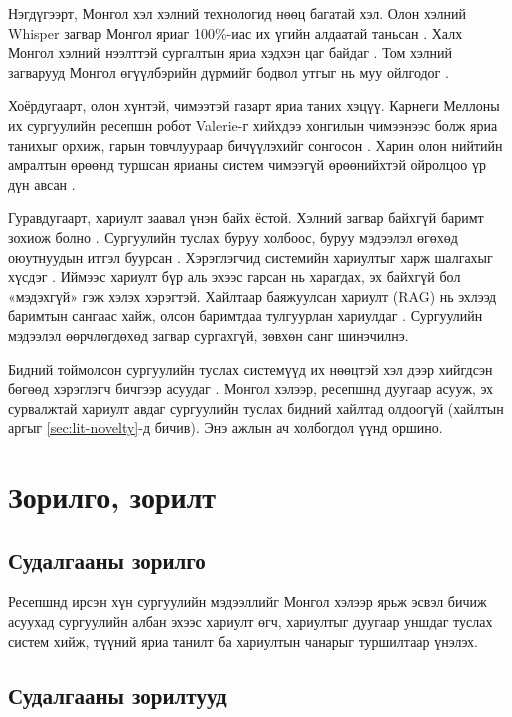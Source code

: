 Нэгдүгээрт, Монгол хэл хэлний технологид нөөц багатай хэл. Олон хэлний Whisper загвар Монгол яриаг 100\%-иас их үгийн алдаатай таньсан \cite{radford2023whisper}. Халх Монгол хэлний нээлттэй сургалтын яриа хэдхэн цаг байдаг \cite{mengke2025khalkha}. Том хэлний загварууд Монгол өгүүлбэрийн дүрмийг бодвол утгыг нь муу ойлгодог \cite{zhang2024mmeval}.

Хоёрдугаарт, олон хүнтэй, чимээтэй газарт яриа таних хэцүү. Карнеги Меллоны их сургуулийн ресепшн робот Valerie-г хийхдээ хонгилын чимээнээс болж яриа танихыг орхиж, гарын товчлуураар бичүүлэхийг сонгосон \cite{gockley2005valerie}. Харин олон нийтийн амралтын өрөөнд туршсан ярианы систем чимээгүй өрөөнийхтэй ойролцоо үр дүн авсан \cite{pappu2014public}.

Гуравдугаарт, хариулт заавал үнэн байх ёстой. Хэлний загвар байхгүй баримт зохиож болно \cite{lewis2020rag}. Сургуулийн туслах буруу холбоос, буруу мэдээлэл өгөхөд оюутнуудын итгэл буурсан \cite{antico2024unimib}. Хэрэглэгчид системийн хариултыг харж шалгахыг хүсдэг \cite{luger2016badpa}. Иймээс хариулт бүр аль эхээс гарсан нь харагдах, эх байхгүй бол «мэдэхгүй» гэж хэлэх хэрэгтэй. Хайлтаар баяжуулсан хариулт (\ac{RAG}) нь эхлээд баримтын сангаас хайж, олсон баримтдаа тулгуурлан хариулдаг \cite{lewis2020rag}. Сургуулийн мэдээлэл өөрчлөгдөхөд загвар сургахгүй, зөвхөн санг шинэчилнэ.

Бидний тоймолсон сургуулийн туслах системүүд их нөөцтэй хэл дээр хийгдсэн бөгөөд хэрэглэгч бичгээр асуудаг \cite{antico2024unimib,trienes2025marcel,tao2025aloha,matic2026burch,gaglio2019campus}. Монгол хэлээр, ресепшнд дуугаар асууж, эх сурвалжтай хариулт авдаг сургуулийн туслах бидний хайлтад олдоогүй (хайлтын аргыг \ref{sec:lit-novelty}-д бичив). Энэ ажлын ач холбогдол үүнд оршино.

\section{Зорилго, зорилт}
\label{sec:intro-goals}

\subsection{Судалгааны зорилго}

Ресепшнд ирсэн хүн сургуулийн мэдээллийг Монгол хэлээр ярьж эсвэл бичиж асуухад сургуулийн албан эхээс хариулт өгч, хариултыг дуугаар уншдаг туслах систем хийж, түүний яриа танилт ба хариултын чанарыг туршилтаар үнэлэх.

\subsection{Судалгааны зорилтууд}

